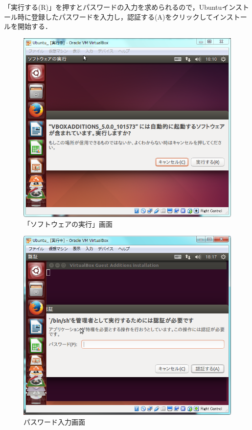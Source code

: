 「実行する(R)」を押すとパスワードの入力を求められるので，Ubuntuインストール時に登録したパスワードを入力し，認証する(A)をクリックしてインストールを開始する．

\begin{figure}[H]
\centering
\includegraphics[width=13cm]{ubuntuguestadditionsinstall02.PNG}
\caption{「ソフトウェアの実行」画面}\label{ubuntuguestadditionsinstall02}
\end{figure}
	
\begin{figure}[H]
\centering
\includegraphics[width=13cm]{ubuntuguestadditionsinstall03.PNG}
\caption{パスワード入力画面}\label{ubuntuguestadditionsinstall03}
\end{figure}
	
